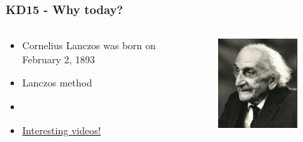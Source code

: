\documentclass{beamer}
\begin{document}
\begin{frame}
\frametitle{KD15 - Why today?}
 \begin{columns}
 \begin{column}{0.6\textwidth}
 \begin{itemize}
  \item Cornelius Lanczos was born on February 2, 1893
  \item Lanczos method
  \item 
  \pause
  \item \href{http://guettel.com/lanczos/}{{\color{red} Interesting videos!}}
 \end{itemize}

 \end{column}

 \begin{column}{0.4\textwidth}
  \begin{figure}[t]
  \includegraphics[width=0.7\textwidth]{pics/Lanczos240.jpg}
  \end{figure}
 \end{column}
 \end{columns}
\end{frame}
\end{document}
